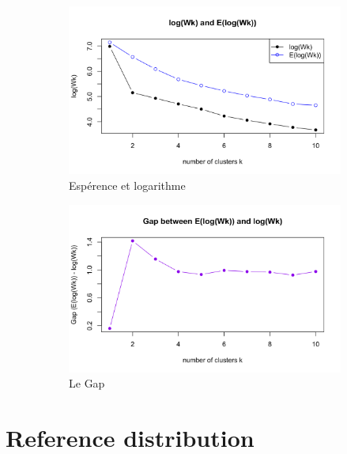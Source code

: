 \begin{figure}[H]
    \vspace{0.5cm} %
    \begin{subfigure}[b]{0.45\linewidth} %
        \centering
        \includegraphics[width=\linewidth]{images/C.png}
        \caption{Espérence et logarithme}
        \label{fig:image-C}
    \end{subfigure}
    \hspace{0.05\linewidth} %
    \begin{subfigure}[b]{0.45\linewidth} %
        \centering
        \includegraphics[width=\linewidth]{images/D.png}
        \caption{Le Gap}
        \label{fig:image-D}
    \end{subfigure}
    
    \caption{}
    \label{fig:four-images}
\end{figure}

\section{Reference distribution}


